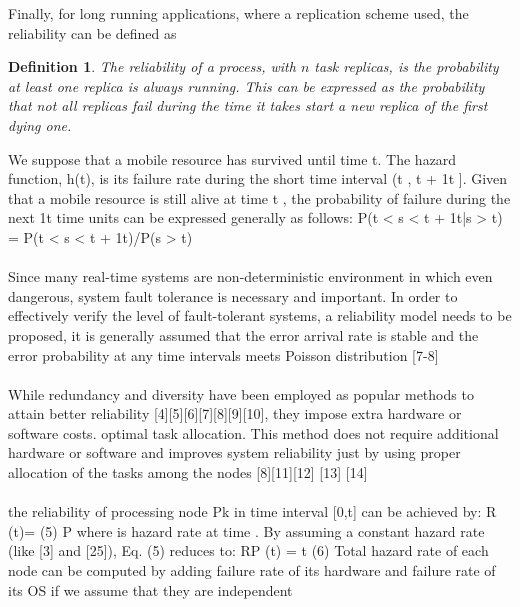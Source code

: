 \documentclass{cslthse-msc}
\newtheorem{definition}{Definition}[chapter]
\begin{document}
Finally, for long running applications, where a replication scheme used, the reliability can be defined as
\begin{definition} \label{def:task_replica_reliability}
The reliability of a process, with $n$ task replicas, is the probability at least one replica is always running. This can be expressed as the probability that not all replicas fail during the time it takes start a new replica of the first dying one.
\end{definition}

\iffalse 
\newpage
We suppose that a mobile resource has survived until time t. The hazard function, h(t), is its failure rate during the short time interval (t , t + 1t ]. Given that a mobile resource is still alive at time t , the probability of failure during the next 1t time units can be expressed generally as follows:
P(t < s < t + 1t|s > t) = P(t < s < t + 1t)/P(s > t) \cite{effTaskReplMobGrid}
\\\\
Since many real-time systems are non-deterministic environment in which even dangerous, system fault tolerance is necessary and important. In order to effectively verify the level of fault-tolerant systems, a reliability model needs to be proposed, it is generally assumed that the error arrival rate is stable and the error probability at any time intervals meets Poisson distribution [7-8] \cite{realTimeSchedAlgo}
\\\\
While redundancy and diversity have been employed as popular methods to attain better reliability [4][5][6][7][8][9][10], they impose extra hardware or software costs.
optimal task allocation. This method does not require additional hardware or software and improves system reliability just by using proper allocation of the tasks among the nodes [8][11][12] [13] [14] \cite{optTaskAllocationForMaxRel}
\\\\
the reliability of processing node Pk in
time interval [0,t] can be achieved by:
R (t)=            (5) P 
where       is hazard rate at time  . By assuming a constant hazard rate (like [3] and [25]), Eq. (5) reduces to:
RP (t) =       t (6) Total hazard rate of each node can be computed by adding failure rate of its hardware and failure rate of its OS if we assume that they are independent 
\\\\
\cite{discContRelModel}
\\\\
\end{document}
